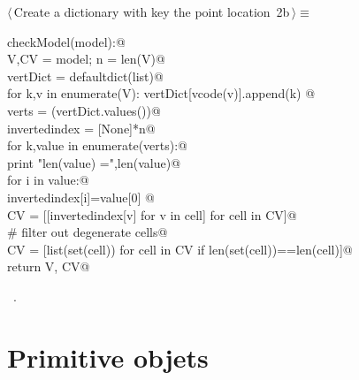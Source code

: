 \documentclass[11pt,oneside]{article}	%
\begin{document}
\begin{flushleft} \small \label{scrap3}
\protect{}$\langle\,$Create a dictionary with key the point location\nobreak\ {\footnotesize 2b}$\,\rangle\equiv$
\vspace{-1ex}
\begin{list}{}{} \item
\mbox{}\verb@def checkModel(model):@\\
\mbox{}\verb@   V,CV = model; n = len(V)@\\
\mbox{}\verb@   vertDict = defaultdict(list)@\\
\mbox{}\verb@   for k,v in enumerate(V): vertDict[vcode(v)].append(k) @\\
\mbox{}\verb@   verts = (vertDict.values())@\\
\mbox{}\verb@   invertedindex = [None]*n@\\
\mbox{}\verb@   for k,value in enumerate(verts):@\\
\mbox{}\verb@      print "\n len(value) =",len(value)@\\
\mbox{}\verb@      for i in value:@\\
\mbox{}\verb@         invertedindex[i]=value[0]  @\\
\mbox{}\verb@   CV = [[invertedindex[v] for v in cell] for cell in CV]@\\
\mbox{}\verb@   # filter out degenerate cells@\\
\mbox{}\verb@   CV = [list(set(cell)) for cell in CV if len(set(cell))==len(cell)]@\\
\mbox{}\verb@   return V, CV@\\
\mbox{}\verb@@{\NWsep}
\end{list}
\vspace{-1ex}
\footnotesize\addtolength{\baselineskip}{-1ex}
\begin{list}{}{\setlength{\itemsep}{-\parsep}\setlength{\itemindent}{-\leftmargin}}
\item \NWtxtMacroRefIn\ .
\end{list}
\end{flushleft}


\section{Primitive objets}
\end{document}
